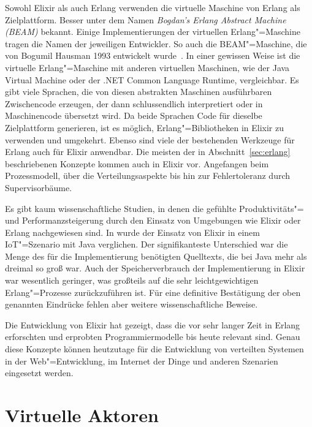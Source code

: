 Sowohl Elixir als auch Erlang verwenden die virtuelle  Maschine von Erlang als Zielplattform. Besser unter dem Namen \textit{Bogdan's Erlang Abstract Machine (BEAM)} bekannt. Einige Implementierungen der virtuellen \mbox{Erlang}"=Maschine tragen die Namen der jeweiligen Entwickler. So auch die \mbox{BEAM}"=Maschine, die von Bogumil Hausman 1993 entwickelt wurde~\cite[12]{Armstrong:2007:HE:1238844.1238850}. In einer gewissen Weise ist die virtuelle Erlang"=Maschine mit anderen virtuellen Maschinen, wie der Java Virtual Machine oder der .NET Common Language Runtime, vergleichbar. Es gibt viele Sprachen, die von diesen abstrakten Maschinen ausführbaren Zwischencode erzeugen, der dann schlussendlich interpretiert oder in Maschinencode übersetzt wird.
Da beide Sprachen Code für dieselbe Zielplattform generieren, ist es möglich, Erlang"=Bibliotheken in Elixir zu verwenden und umgekehrt. Ebenso sind viele der bestehenden Werkzeuge für Erlang auch für Elixir anwendbar. Die meisten der in Abschnitt~\ref{sec:erlang} beschriebenen Konzepte kommen auch in Elixir vor. Angefangen beim Prozessmodell, über die Verteilungsaspekte bis hin zur Fehlertoleranz durch Supervisorbäume.

Es gibt kaum wissenschaftliche Studien, in denen die gefühlte Produktivitäts"= und Performanzsteigerung durch den Einsatz von Umgebungen wie Elixir oder Erlang nachgewiesen sind. In \cite{ElixirIot} wurde der Einsatz von Elixir in einem IoT"=Szenario mit Java verglichen. Der signifikanteste Unterschied war die Menge des für die Implementierung benötigten Quelltexts, die bei Java mehr als dreimal so groß war. Auch der Speicherverbrauch der Implementierung in Elixir war wesentlich geringer, was großteils auf die sehr leichtgewichtigen Erlang"=Prozesse zurückzuführen ist. Für eine definitive Bestätigung der oben genannten Eindrücke fehlen aber weitere wissenschaftliche Beweise.

Die Entwicklung von Elixir hat gezeigt, dass die vor sehr langer Zeit in Erlang erforschten und erprobten Programmiermodelle bis heute relevant sind. Genau diese Konzepte können heutzutage für die Entwicklung von verteilten Systemen in der Web"=Entwicklung, im Internet der Dinge und anderen Szenarien eingesetzt werden.

\section{Virtuelle Aktoren}

